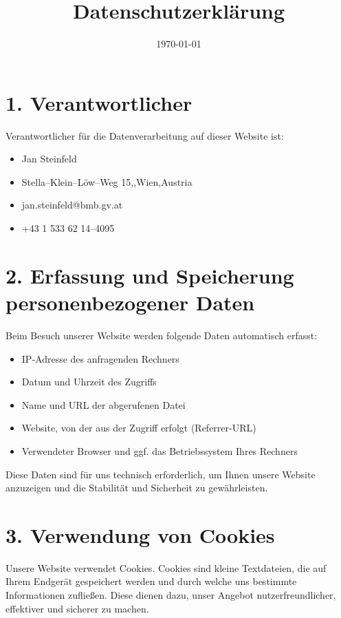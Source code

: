 \documentclass[a4paper,12pt]{article}
\title{Datenschutzerklärung}
\author{\Name}
\date{\today}
\makeatletter
\newcommand{\Strasse}{Stella--Klein--Löw--Weg 15}
\newcommand{\PLZ}{1020}
\newcommand{\Ort}{Wien}
\newcommand{\Land}{Austria}
\newcommand{\email}{jan.steinfeld@bmb.gv.at}
\newcommand{\Telefonnummer}{+43 1 533 62 14--4095}
\makeatother
\begin{document}
\maketitle

\section*{1. Verantwortlicher}

Verantwortlicher für die Datenverarbeitung auf dieser Website ist:

\begin{itemize}
    \item Jan Steinfeld
    \item \Strasse,\quad\PLZ,\quad\Ort,\quad\Land
    \item \email
    \item \Telefonnummer
\end{itemize}

\section*{2. Erfassung und Speicherung personenbezogener Daten}

Beim Besuch unserer Website werden folgende Daten automatisch erfasst:

\begin{itemize}
    \item IP-Adresse des anfragenden Rechners
    \item Datum und Uhrzeit des Zugriffs
    \item Name und URL der abgerufenen Datei
    \item Website, von der aus der Zugriff erfolgt (Referrer-URL)
    \item Verwendeter Browser und ggf. das Betriebssystem Ihres Rechners
\end{itemize}

Diese Daten sind für uns technisch erforderlich, um Ihnen unsere Website anzuzeigen und die Stabilität und Sicherheit zu gewährleisten.

\section*{3. Verwendung von Cookies}

Unsere Website verwendet Cookies. Cookies sind kleine Textdateien, die auf Ihrem Endgerät gespeichert werden und durch welche uns bestimmte Informationen zufließen. Diese dienen dazu, unser Angebot nutzerfreundlicher, effektiver und sicherer zu machen.
\end{document}
